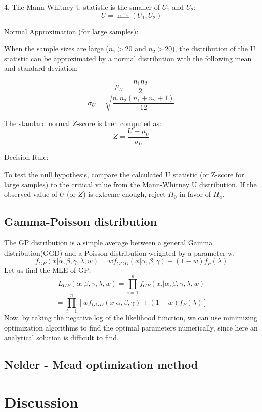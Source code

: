 \documentclass[conference]{IEEEtran}
\begin{document}
4. The Mann-Whitney U statistic is the smaller of \( U_1 \) and \( U_2 \):
\[
U = \min(U_1, U_2)
\]

Normal Approximation (for large samples):

When the sample sizes are large (\(n_1 > 20\) and \(n_2 > 20\)), the distribution of the U statistic can be approximated by a normal distribution with the following mean and standard deviation:

\[
\mu_U = \frac{n_1 n_2}{2}
\]
\[
\sigma_U = \sqrt{\frac{n_1 n_2 (n_1 + n_2 + 1)}{12}}
\]

The standard normal \( Z \)-score is then computed as:
\[
Z = \frac{U - \mu_U}{\sigma_U}
\]

Decision Rule:

To test the null hypothesis, compare the calculated U statistic (or Z-score for large samples) to the critical value from the Mann-Whitney U distribution. If the observed value of \( U \) (or \( Z \)) is extreme enough, reject \( H_0 \) in favor of \( H_a \).

\subsection{Gamma-Poisson distribution}
The GP distribution is a simple average between a general Gamma distribution(GGD) and a Poisson distribution weighted by a parameter w.
\[f_{GP}(x|\alpha, \beta, \gamma, \lambda, w) = wf_{GGD}(x|\alpha, \beta, \gamma) + (1-w)f_P(\lambda)\]
Let us find the MLE of GP:
\[L_{GP}(\alpha, \beta, \gamma, \lambda, w) = \prod_{i=1}^n f_{GP}(x_i|\alpha, \beta, \gamma, \lambda, w)\]
\[= \prod_{i=1}^n [wf_{GGD}(x|\alpha, \beta, \gamma) + (1-w)f_P(\lambda)]\]
Now, by taking the negative log of the likelihood function, we can use minimizing optimization algorithms to find the optimal parameters numerically, since here an analytical solution is difficult to find.

\subsection{Nelder - Mead optimization method}

\section{Discussion}

\newpage


\end{document}
